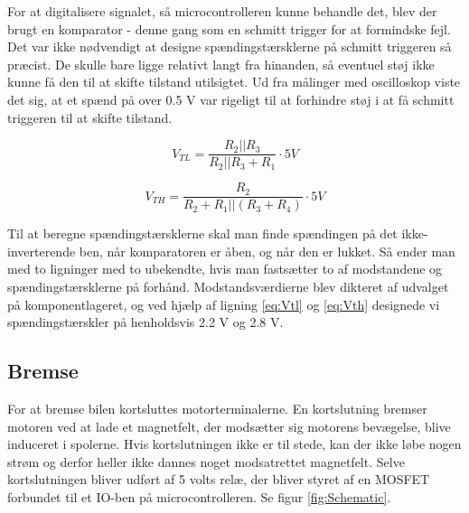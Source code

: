 For at digitalisere signalet, så microcontrolleren kunne behandle det, blev der brugt en komparator - denne gang som en schmitt trigger for at formindske fejl. Det var ikke nødvendigt at designe spændingstærsklerne på schmitt triggeren så præcist. De skulle bare ligge relativt langt fra hinanden, så eventuel støj ikke kunne få den til at skifte tilstand utilsigtet. Ud fra  målinger med oscilloskop viste det sig, at et spænd på over 0.5 V var rigeligt til at forhindre støj i at få schmitt triggeren til at skifte tilstand.

\begin{equation}
V_{TL} = \dfrac{R_{2}||R_{3}}{R_{2}||R_{3}+R_{1}} \cdot 5V
\label{eq:Vtl}
\end{equation}


\begin{equation}
V_{TH} = \dfrac{R_{2}}{R_{2}+R_{1}||(R_{3}+R_{4})} \cdot 5V
\label{eq:Vth}
\end{equation}



Til at beregne spændingstærsklerne skal man finde spændingen på det ikke-inverterende ben, når komparatoren er åben, og når den er lukket. Så ender man med to ligninger med to ubekendte, hvis man fastsætter to af modstandene og spændingstærsklerne på forhånd. Modstandsværdierne blev dikteret af udvalget på komponentlageret, og ved hjælp af ligning \eqref{eq:Vtl} og \eqref{eq:Vth} designede vi spændingstærskler på henholdsvis 2.2 V og 2.8 V. 

\subsection{Bremse}
\label{sec:Bremse}

For at bremse bilen kortsluttes motorterminalerne. En kortslutning bremser motoren ved at lade et magnetfelt, der modsætter sig motorens bevægelse, blive induceret i spolerne. Hvis kortslutningen ikke er til stede, kan der ikke løbe nogen strøm og derfor heller ikke dannes noget modsatrettet magnetfelt. Selve kortslutningen bliver udført af 5 volts relæ, der bliver styret af en MOSFET forbundet til et IO-ben på microcontrolleren. Se figur \ref{fig:Schematic}. 

